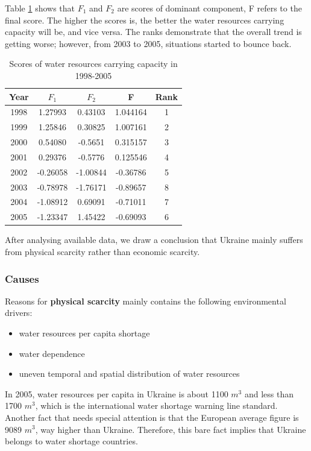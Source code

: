 Table \ref{scores} shows that $F_1$ and $F_2$ are scores of dominant component, F refers to the final score. The higher the scores is, the better the water resources carrying capacity will be, and vice versa. The ranks demonstrate that the overall trend is getting worse; however, from 2003 to 2005, situations started to bounce back.
\begin{table}[h]
\centering\caption{Scores of water resources carrying capacity in 1998-2005}
\begin{tabular}{c|ccc|c}
  \hline
  Year & $F_1$ & $F_2$ & F & Rank \\
   \hline
  1998 & 1.27993& 0.43103& 1.044164& 1\\
  1999 & 1.25846& 0.30825& 1.007161& 2\\
  2000 & 0.54080& -0.5651& 0.315157& 3\\
  2001 & 0.29376& -0.5776& 0.125546& 4\\
  2002& -0.26058& -1.00844& -0.36786& 5\\
  2003& -0.78978& -1.76171& -0.89657& 8\\
  2004& -1.08912& 0.69091& -0.71011& 7 \\
  2005& -1.23347& 1.45422& -0.69093& 6 \\
  \hline
\end{tabular}\label{scores}
\end{table}

After analysing available data, we draw a conclusion that Ukraine mainly suffers from physical scarcity rather than economic scarcity.
\subsubsection{Causes}
Reasons for \textbf{physical scarcity} mainly contains the following environmental drivers:
\begin{itemize}
\item water resources per capita shortage
\item water dependence
\item uneven temporal and spatial distribution of water resources
\end{itemize}

In 2005, water resources per capita in Ukraine is about 1100 $m^3$ and less than 1700 $m^3$, which is the international water shortage warning line standard. Another fact that needs special attention is that the European average figure is 9089 $m^3$, way higher than Ukraine. Therefore, this bare fact implies that Ukraine belongs to water shortage countries.


